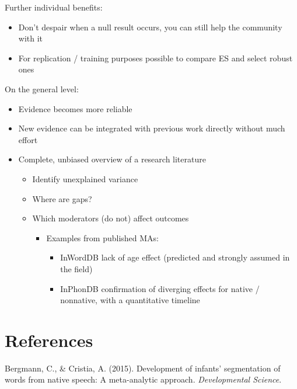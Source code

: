 \documentclass[english,floatsintext,man]{apa6}
\begin{document}
Further individual benefits:

\begin{itemize}
\itemsep1pt\parskip0pt
\item
  Don't despair when a null result occurs, you can still help the
  community with it
\item
  For replication / training purposes possible to compare ES and select
  robust ones
\end{itemize}

On the general level:

\begin{itemize}
\itemsep1pt\parskip0pt
\item
  Evidence becomes more reliable
\item
  New evidence can be integrated with previous work directly without
  much effort
\item
  Complete, unbiased overview of a research literature

  \begin{itemize}
  \itemsep1pt\parskip0pt
  \item
    Identify unexplained variance
  \item
    Where are gaps?
  \item
    Which moderators (do not) affect outcomes

    \begin{itemize}
    \itemsep1pt\parskip0pt
    \item
      Examples from published MAs:

      \begin{itemize}
      \itemsep1pt\parskip0pt
      \item
        InWordDB lack of age effect (predicted and strongly assumed in
        the field)
      \item
        InPhonDB confirmation of diverging effects for native /
        nonnative, with a quantitative timeline
      \end{itemize}
    \end{itemize}
  \end{itemize}
\end{itemize}

\section*{References}\label{references}

Bergmann, C., \& Cristia, A. (2015). Development of infants'
segmentation of words from native speech: A meta-analytic approach.
\emph{Developmental Science}.
\end{document}
